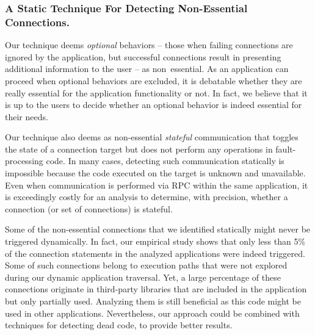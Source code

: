 \subsubsection{A Static Technique For Detecting Non-Essential Connections.}
Our technique deems \emph{optional} behaviors -- those when failing connections are ignored by the application, but successful connections result in presenting additional information to the user -- as non~essential. 
As an application can proceed when optional behaviors are excluded, it is debatable whether they are really essential for the application functionality or not. 
In fact, we believe that it is up to the users to decide whether an optional behavior is indeed essential for their needs. 

Our technique also deems as non-essential \emph{stateful} communication that toggles
the state of a connection target but does not perform any operations in
fault-processing code. In many cases, detecting such
communication statically is impossible because the code executed on
the target is unknown and unavailable.  Even when communication is
performed via RPC within the same application, it is exceedingly
costly for an analysis to determine, with precision, whether a
connection (or set of connections) is stateful. 
 
Some of the non-essential connections that we identified statically might never be triggered dynamically. In fact, our empirical study shows that only less than 5\% of the connection statements in the analyzed applications were indeed triggered.
Some of such connections belong to execution paths that were not explored during our dynamic application traversal.
Yet, a large percentage of these connections originate in  
third-party libraries that are included in the application but only partially used. 
Analyzing them is still beneficial as this code might be used in other applications.
Nevertheless, our approach could be combined with techniques for detecting dead code, to provide better results.
